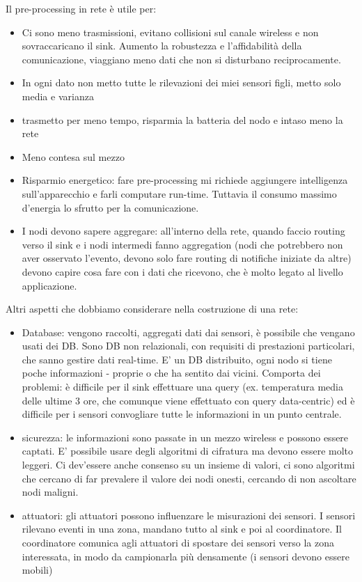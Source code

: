\documentclass[12pt,italian]{report}
\begin{document}
\noindent Il pre-processing in rete è utile per:
\begin{itemize}
    \item Ci sono meno trasmissioni, evitano collisioni sul canale wireless e non sovraccaricano il sink. Aumento la robustezza e l'affidabilità della comunicazione, viaggiano meno dati che non si disturbano reciprocamente. 
    \item In ogni dato non metto tutte le rilevazioni dei miei sensori figli, metto solo media e varianza
    \item trasmetto per meno tempo, risparmia la batteria del nodo e intaso meno la rete
    \item Meno contesa sul mezzo
    \item Risparmio energetico: fare pre-processing mi richiede aggiungere intelligenza sull'apparecchio e farli computare run-time. Tuttavia il consumo massimo d'energia lo sfrutto per la comunicazione. 
    \item I nodi devono sapere aggregare: all'interno della rete, quando faccio routing verso il sink e i nodi intermedi fanno aggregation (nodi che potrebbero non aver osservato l'evento, devono solo fare routing di notifiche iniziate da altre) devono capire cosa fare con i dati che ricevono, che è molto legato al livello applicazione. 
\end{itemize}

Altri aspetti che dobbiamo considerare nella costruzione di una rete:
\begin{itemize}
    \item Database: vengono raccolti, aggregati dati dai sensori, è possibile che vengano usati dei DB. Sono DB non relazionali, con requisiti di prestazioni particolari, che sanno gestire dati real-time. E' un DB distribuito, ogni nodo si tiene poche informazioni - proprie o che ha sentito dai vicini. Comporta dei problemi: è difficile per il sink effettuare una query (ex. temperatura media delle ultime 3 ore, che comunque viene effettuato con query data-centric) ed è difficile per i sensori convogliare tutte le informazioni in un punto centrale. 
    \item sicurezza: le informazioni sono passate in un mezzo wireless e possono essere captati. E' possibile usare degli algoritmi di cifratura ma devono essere molto leggeri. Ci dev'essere anche consenso su un insieme di valori, ci sono algoritmi che cercano di far prevalere il valore dei nodi onesti, cercando di non ascoltare nodi maligni.
    \item attuatori: gli attuatori possono influenzare le misurazioni dei sensori. I sensori rilevano eventi in una zona, mandano tutto al sink e poi al coordinatore. Il coordinatore comunica agli attuatori di spostare dei sensori verso la zona interessata, in modo da campionarla più densamente (i sensori devono essere mobili)
\end{itemize}
\end{document}
